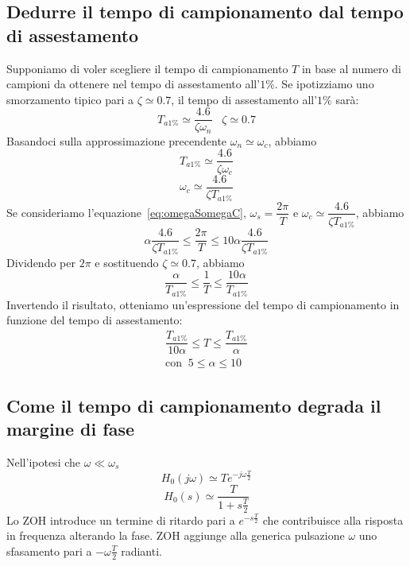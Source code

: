 \documentclass[a4paper]{report}
\begin{document}
\subsection{Dedurre il tempo di campionamento dal tempo di
  assestamento}
Supponiamo di voler scegliere il tempo di campionamento $T$ in base al
numero di campioni da ottenere nel tempo di assestamento all'$1\%$.
Se ipotizziamo uno smorzamento tipico pari a $\zeta \simeq 0.7$, il 
tempo di assestamento all'$1\%$ sar\`a:
\[
T_{a 1\%} \simeq \dfrac{4.6}{\zeta \omega_n}\;\;\;\zeta \simeq 0.7
\]
Basandoci sulla approssimazione precendente $\omega_n \simeq
\omega_c$, abbiamo
\[
T_{a 1\%} \simeq \dfrac{4.6}{\zeta \omega_c}
\]
\[
\omega_c \simeq \dfrac{4.6}{\zeta T_{a 1\%}}
\]
Se consideriamo l'equazione~\ref{eq:omegaSomegaC}, $\omega_s = \dfrac{2
  \pi}{T}$ e $\omega_c \simeq \dfrac{4.6}{\zeta T_{a 1\%}}$, abbiamo
\[
\alpha \dfrac{4.6}{\zeta T_{a 1\%}} \leq \dfrac{2 \pi}{T} \leq 10
\alpha \dfrac{4.6}{\zeta T_{a 1\%}} 
\]
Dividendo per $2 \pi$ e sostituendo $\zeta \simeq 0.7$, abbiamo
\[
\dfrac{\alpha}{T_{a 1\%}} \leq \dfrac{1}{T} \leq \dfrac{10
  \alpha}{T_{a 1\%}} 
\]
Invertendo il risultato, otteniamo un'espressione del tempo di
campionamento in funzione del tempo di assestamento:
\begin{equation}
  \begin{array}{l}
    \dfrac{T_{a 1\%}}{10 \alpha} \leq T \leq \dfrac{T_{a
        1\%}}{\alpha}\\
    \textrm{con}\;\;5 \leq \alpha \leq 10
  \end{array}
\end{equation}

\subsection{Come il tempo di campionamento degrada il margine di fase} 
Nell'ipotesi che $\omega \ll \omega_s$
\[
H_0(j \omega) \simeq T e^{-j \omega \frac{T}{2}}
\]
\[
H_0(s) \simeq \dfrac{T}{1 + s \frac{T}{2}}
\]
Lo ZOH introduce un termine di ritardo pari a $e^{-s\frac{T}{2}}$ che
contribuisce alla risposta in frequenza alterando la fase. ZOH
aggiunge alla generica pulsazione $\omega$ uno sfasamento pari a $-
\omega \frac{T}{2}$ radianti.
\end{document}

